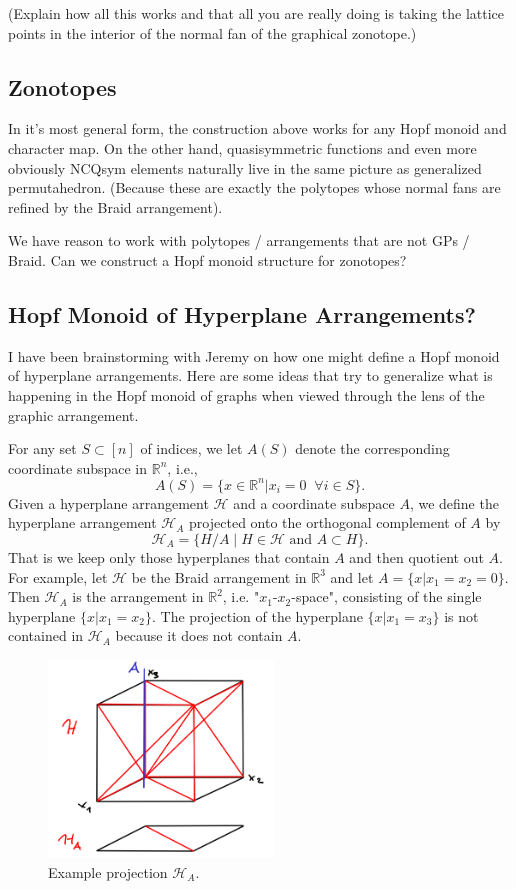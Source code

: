 \documentclass[11pt,letter]{amsart}
\newcommand{\RR}{\mathbb{R}}
\newcommand{\HHH}{\mathcal{H}}
\begin{document}
(Explain how all this works and that all you are really doing is
taking the lattice points in the interior of the normal fan of the
graphical zonotope.)

\subsection{Zonotopes}

In it's most general form, the construction above works for any Hopf
monoid and character map.  On the other hand, quasisymmetric functions
and even more obviously NCQsym elements naturally live in the same
picture as generalized permutahedron.  (Because these are exactly the
polytopes whose normal fans are refined by the Braid arrangement).

We have reason to work with polytopes / arrangements that are not GPs
/ Braid.  Can we construct a Hopf monoid structure for
zonotopes?  

\subsection{Hopf Monoid of Hyperplane Arrangements?}

I have been brainstorming with Jeremy on how one might define a Hopf monoid of hyperplane arrangements. Here are some ideas that try to generalize what is happening in the Hopf monoid of graphs when viewed through the lens of the graphic arrangement. 

For any set $S\subset[n]$ of indices, we let $A(S)$ denote the corresponding coordinate subspace in $\RR^n$, i.e.,
\[
  A(S) = \{ x\in\RR^n | x_i=0 \;\;\forall i\in S\}.
\]
Given a hyperplane arrangement $\HHH$ and a coordinate subspace $A$, we define the hyperplane arrangement $\HHH_A$ projected onto the orthogonal complement of $A$ by
\[
  \HHH_A = \{ H/A \; | \;  H\in\HHH \text{ and } A\subset H\}.
\]
That is we keep only those hyperplanes that contain $A$ and then quotient out $A$. For example, let $\HHH$ be the Braid arrangement in $\RR^3$ and let $A=\{x| x_1=x_2=0\}$. Then $\HHH_A$ is the arrangement in $\RR^2$, i.e. "$x_1$-$x_2$-space", consisting of the single hyperplane $\{x|x_1=x_2\}$. The projection of the hyperplane $\{x|x_1=x_3\}$ is not contained in $\HHH_A$ because it does not contain $A$.

\begin{figure}
\includegraphics[width=6cm]{monoid}
\caption{Example projection $\HHH_A$.}
\end{figure}
\end{document}
